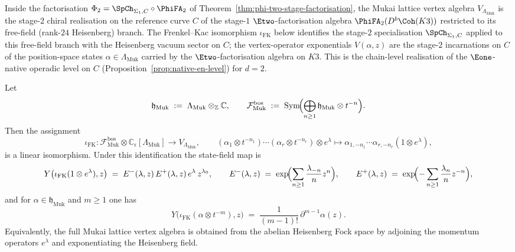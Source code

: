 \begin{remark}
\label{rem:k3y-stage-mukai-frenkel-kac}
Inside the factorisation $\Phi_2 = \SpCh_{\Sigma_1, C}\circ\PhiFA_2$
of Theorem~\ref{thm:phi-two-stage-factorisation}, the Mukai lattice
vertex algebra $V_{\Lambda_{\mathrm{Muk}}}$ is the stage-$2$ chiral realisation
on the reference curve $C$ of the stage-$1$ $\Etwo$-factorisation
algebra $\PhiFA_2(D^b\Coh(K3))$ restricted to its free-field
(rank-$24$ Heisenberg) branch. The Frenkel--Kac isomorphism
$\iota_{\mathrm{FK}}$ below identifies the stage-$2$ specialisation
$\SpCh_{\Sigma_1, C}$ applied to this free-field branch with the
Heisenberg vacuum sector on $C$; the vertex-operator exponentials
$V(\alpha, z)$ are the stage-$2$ incarnations on $C$ of the
position-space states
$\alpha \in \Lambda_{\mathrm{Muk}}$ carried by the $\Etwo$-factorisation
algebra on $K3$. This is the chain-level realisation of the $\Eone$-native
operadic level on $C$ (Proposition~\ref{prop:native-en-level}) for
$d = 2$.
\end{remark}

\begin{theorem}
\label{thm:mukai-frenkel-kac-map}
Let
\[
 \mathfrak{h}_{\mathrm{Muk}}
 \;:=\;
 \Lambda_{\mathrm{Muk}}\otimes_{\mathbb{Z}}\mathbb{C},
 \qquad
 \mathcal{F}^{\mathrm{bos}}_{\mathrm{Muk}}
 \;:=\;
 \mathrm{Sym}\!\Bigl(\bigoplus_{n\geq 1}\mathfrak{h}_{\mathrm{Muk}}\otimes t^{-n}\Bigr).
\]
Then the assignment
\[
 \iota_{\mathrm{FK}}\colon
 \mathcal{F}^{\mathrm{bos}}_{\mathrm{Muk}}\otimes
 \mathbb{C}_\epsilon[\Lambda_{\mathrm{Muk}}]
 \longrightarrow
 V_{\Lambda_{\mathrm{Muk}}},
 \qquad
 (\alpha_1\otimes t^{-n_1})\cdots(\alpha_r\otimes t^{-n_r})\otimes e^\lambda
 \longmapsto
 \alpha_{1,-n_1}\cdots\alpha_{r,-n_r}(1\otimes e^\lambda),
\]
is a linear isomorphism. Under this identification the state-field map is
\begin{equation}
\label{eq:mukai-state-field-map}
 Y\bigl(\iota_{\mathrm{FK}}(1\otimes e^\lambda),z\bigr)
 \;=\;
 E^{-}(\lambda,z)\,E^{+}(\lambda,z)\,e^\lambda\, z^{\lambda_0},
 \qquad
 E^{-}(\lambda,z)
 \;=\;
 \exp\!\Bigl(\sum_{n\geq 1}\frac{\lambda_{-n}}{n}z^n\Bigr),
 \qquad
 E^{+}(\lambda,z)
 \;=\;
 \exp\!\Bigl(-\sum_{n\geq 1}\frac{\lambda_n}{n}z^{-n}\Bigr),
\end{equation}
and for $\alpha\in\mathfrak{h}_{\mathrm{Muk}}$ and $m\geq 1$ one has
\[
 Y\bigl(\iota_{\mathrm{FK}}(\alpha\otimes t^{-m}),z\bigr)
 \;=\;
 \frac{1}{(m-1)!}\,\partial^{m-1}\alpha(z).
\]
Equivalently, the full Mukai lattice vertex algebra is obtained from the
abelian Heisenberg Fock space by adjoining the momentum operators
$e^\lambda$ and exponentiating the Heisenberg field.
\end{theorem}

